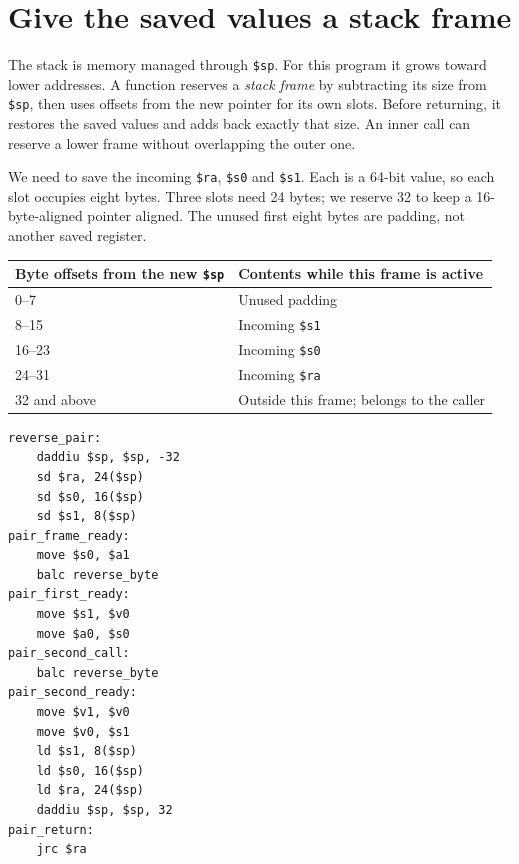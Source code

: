 \section{Give the saved values a stack frame}

The stack is memory managed through \texttt{\$sp}. For this program it grows toward
lower addresses. A function reserves a \emph{stack frame} by subtracting its size
from \texttt{\$sp}, then uses offsets from the new pointer for its own slots.
Before returning, it restores the saved values and adds back exactly that size.
An inner call can reserve a lower frame without overlapping the outer one.

We need to save the incoming \texttt{\$ra}, \texttt{\$s0} and \texttt{\$s1}.
Each is a 64-bit value, so each slot occupies eight bytes. Three slots need 24
bytes; we reserve 32 to keep a 16-byte-aligned pointer aligned. The unused first
eight bytes are padding, not another saved register.

\begin{center}
  \begin{tabular}{ll}
    \toprule
    Byte offsets from the new \texttt{\$sp} & Contents while this frame is active       \\
    \midrule
    0--7                                    & Unused padding                            \\
    8--15                                   & Incoming \texttt{\$s1}                    \\
    16--23                                  & Incoming \texttt{\$s0}                    \\
    24--31                                  & Incoming \texttt{\$ra}                    \\
    32 and above                            & Outside this frame; belongs to the caller \\
    \bottomrule
  \end{tabular}
\end{center}

\begin{verbatim}
reverse_pair:
    daddiu $sp, $sp, -32
    sd $ra, 24($sp)
    sd $s0, 16($sp)
    sd $s1, 8($sp)
pair_frame_ready:
    move $s0, $a1
    balc reverse_byte
pair_first_ready:
    move $s1, $v0
    move $a0, $s0
pair_second_call:
    balc reverse_byte
pair_second_ready:
    move $v1, $v0
    move $v0, $s1
    ld $s1, 8($sp)
    ld $s0, 16($sp)
    ld $ra, 24($sp)
    daddiu $sp, $sp, 32
pair_return:
    jrc $ra
\end{verbatim}

